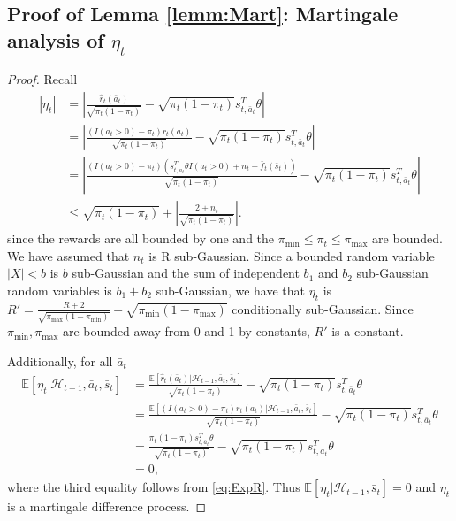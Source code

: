 \documentclass{article}
\begin{document}
\begin{appendices}
\subsection{Proof of Lemma \ref{lemm:Mart}: Martingale analysis of $\eta_t$ }\label{supp:Mart}
\begin{proof}
Recall
\begin{align*}
|\eta_t| &= \left|\frac{\hat{r}_t(\bar{a}_t)}{\sqrt{\pi_t(1-\pi_t)}} - \sqrt{\pi_t(1-\pi_t)} s_{t,\bar{a}_t}^T \theta\right|\\
&= \left|\frac{(I(a_t>0) - \pi_t) r_t(a_t)}{\sqrt{\pi_t(1-\pi_t)}} - \sqrt{\pi_t(1-\pi_t)} s_{t,\bar{a}_t}^T \theta\right|\\
&= \left|\frac{(I(a_t>0) - \pi_t) ( s_{t,a_t}^T \theta I(a_t > 0) + n_t + \bar{f}_t(\bar{s}_t))}{\sqrt{\pi_t(1-\pi_t)}} - \sqrt{\pi_t(1-\pi_t)} s_{t,\bar{a}_t}^T \theta\right|\\
&\leq \sqrt{\pi_t(1-\pi_t)} + \left| \frac{2+n_t}{\sqrt{\pi_t(1-\pi_t)}}\right|.
\end{align*}
since the rewards are all bounded by one and the $\pi_{\min} \leq \pi_t \leq \pi_{\max}$ are bounded. 
We have assumed that $n_t$ is R sub-Gaussian. Since a bounded random variable $|X|< b$ is $b$ sub-Gaussian and the sum of independent $b_1$ and $b_2$ sub-Gaussian random variables is $b_1 + b_2$ sub-Gaussian, we have that $\eta_t$ is $R' = \frac{R+2}{\sqrt{\pi_{\max}(1-\pi_{\min})}} +\sqrt{\pi_{\min}(1-\pi_{\max})}$ conditionally sub-Gaussian.
Since $\pi_{\min},\pi_{\max}$ are bounded away from 0 and 1 by constants, $R'$ is a constant.




Additionally, for all $\bar{a}_t$
\begin{align*}
\mathbb{E}[\eta_t |\mathcal{H}_{t-1},\bar{a}_t,\bar{s}_t]&= \frac{\mathbb{E}[\hat{r}_t(\bar{a}_t)|\mathcal{H}_{t-1},\bar{a}_t,\bar{s}_t]}{\sqrt{\pi_t(1-\pi_t)}} - \sqrt{\pi_t(1-\pi_t)} s_{t,\bar{a}_t}^T \theta\\
&= \frac{\mathbb{E}[(I(a_t>0) - \pi_t) r_t(a_t)|\mathcal{H}_{t-1},\bar{a}_t,\bar{s}_t]}{\sqrt{\pi_t(1-\pi_t)}} - \sqrt{\pi_t(1-\pi_t)} s_{t,\bar{a}_t}^T \theta\\
&= \frac{\pi_t (1-\pi_t)s_{t,\bar{a}_t}^T \theta}{\sqrt{\pi_t(1-\pi_t)}} - \sqrt{\pi_t(1-\pi_t)} s_{t,\bar{a}_t}^T \theta\\
&=0,
\end{align*}
where the third equality follows from \eqref{eq:ExpR}. Thus $\mathbb{E}[\eta_t |\mathcal{H}_{t-1},\bar{s}_t] = 0$ and $\eta_t$ is a martingale difference process.




\end{proof}
\end{appendices}
\end{document}
